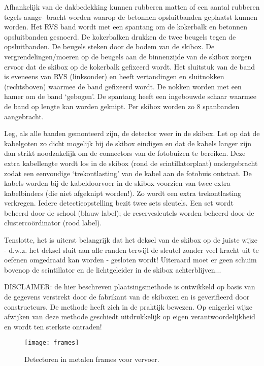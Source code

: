 Afhankelijk van de dakbedekking kunnen rubberen matten of een aantal
rubberen tegels aange- bracht worden waarop de betonnen opsluitbanden
geplaatst kunnen worden. Het RVS band wordt met een spantang om de
kokerbalk en betonnen opsluitbanden gesnoerd. De kokerbalken drukken de
twee beugels tegen de opsluitbanden. De beugels steken door de bodem van
de skibox. De vergrendelingen/moeren op de beugels aan de binnenzijde
van de skibox zorgen ervoor dat de skibox op de kokerbalk gefixeerd
wordt. Het sluitstuk van de band is eveneens van RVS (linksonder) en
heeft vertandingen en sluitnokken (rechtsboven) waarmee de band
gefixeerd wordt. De nokken worden met een hamer om de band ‘gebogen’. De
spantang heeft een ingebouwde schaar waarmee de band op lengte kan
worden geknipt. Per skibox worden zo 8 spanbanden aangebracht.

Leg, als alle banden gemonteerd zijn, de detector weer in de skibox. Let
op dat de kabelgoten zo dicht mogelijk bij de skibox eindigen en dat de
kabels langer zijn dan strikt noodzakelijk om de connectors van de
fotobuizen te bereiken. Deze extra kabellengte wordt los in de skibox
(rond de scintillatorplaat) ondergebracht zodat een
eenvoudige ‘trekontlasting’ van de kabel aan de fotobuis ontstaat. De
kabels worden bij de kabeldoorvoer in de skibox voorzien van twee extra
kabelbinders (die niet afgeknipt worden!). Zo wordt een extra
trekontlasting verkregen. Iedere detectieopstelling bezit twee sets
sleutels. Een set wordt beheerd door de school (blauw label); de
reservesleutels worden beheerd door de clustercoördinator (rood label).

Tenslotte, het is uiterst belangrijk dat het deksel van de skibox op de
juiste wijze - d.w.z. het deksel sluit aan alle randen terwijl de
sleutel zonder veel kracht uit te oefenen omgedraaid kan worden -
gesloten wordt! Uiteraard moet er geen schuim bovenop de
scintillator en de lichtgeleider in de skibox achterblijven...

DISCLAIMER: de hier beschreven plaatsingsmethode is ontwikkeld op basis
van de gegevens verstrekt door de fabrikant van de skiboxen en is
geverifieerd door constructeurs. De methode heeft zich in de praktijk
bewezen. Op enigerlei wijze afwijken van deze methode geschiedt
uitdrukkelijk op eigen verantwoordelijkheid en wordt ten sterkste
ontraden!

\begin{figure}
    \centering
    \texttt{[image: frames]}
    \label{fig:frames}
    \caption{Detectoren in metalen frames voor vervoer.}
\end{figure}


